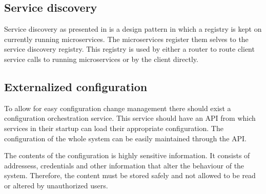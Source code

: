 \subsection{Service discovery}
\begin{sloppypar}
    Service discovery as presented in \citet{DBLP:journals/corr/MontesiW16} is a 
    design pattern in which a registry is kept on currently running microservices. 
    The microservices register them selves to the service discovery registry. 
    This registry is used by either a router to route client service calls to 
    running microservices or by the client directly.
\end{sloppypar}



\subsection{Externalized configuration}
\begin{sloppypar}
    To allow for easy configuration change management there should exist a 
    configuration orchestration service. This service should have an API from 
    which services in their startup can load their appropriate configuration. 
    The configuration of the whole system can be easily maintained through the 
    API.
\end{sloppypar}
\begin{sloppypar}
    The contents of the configuration is highly sensitive information. It 
    consists of addressess, credentials and other information that alter 
    the behaviour of the system. Therefore, the content must be stored safely 
    and not allowed to be read or altered by unauthorized users.
\end{sloppypar}





